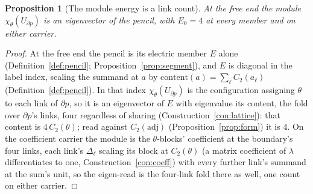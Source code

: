 \documentclass[11pt]{article}
\newtheorem{proposition}{Proposition}
\theoremstyle{definition}
\begin{document}
\begin{proposition}[The module energy is a link count]\label{prop:E0}
At the free end the module $\chi_\theta(U_{\partial p})$ is an eigenvector of
the pencil, with $E_0=4$ at every member and on either carrier.
\end{proposition}
\begin{proof}
At the free end the pencil is its electric member $E$ alone
(Definition~\ref{def:pencil}; Proposition~\ref{prop:segment}), and
$E$ is diagonal in the label index, scaling the summand at $a$ by
$\mathrm{content}(a)=\sum_\ell C_2(a_\ell)$ (Definition~\ref{def:pencil}). In
that index $\chi_\theta(U_{\partial p})$ is the configuration assigning $\theta$
to each link of $\partial p$, so it is
an eigenvector of $E$ with eigenvalue its content, the fold over
$\partial p$'s links, four regardless of sharing
(Construction~\ref{con:lattice}): that
content is $4\,C_2(\theta)$; read against $C_2(\mathrm{adj})$
(Proposition~\ref{prop:form}) it is $4$. On the coefficient
carrier the module is the $\theta$-blocks' coefficient at the
boundary's four links, each link's $\Delta_\ell$ scaling its block
at $C_2(\theta)$ (a matrix coefficient of $\lambda$ differentiates
to one, Construction~\ref{con:coeff}) with every further link's
summand at the sum's unit, so the eigen-read is the four-link fold
there as well, one count on either carrier.
\end{proof}
\end{document}
